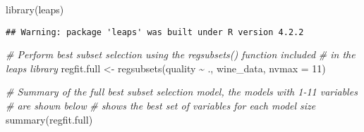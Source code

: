 \documentclass[
]{article}
\newenvironment{Shaded}{\begin{snugshade}}{\end{snugshade}}
\newcommand{\AttributeTok}[1]{\textcolor[rgb]{0.77,0.63,0.00}{#1}}
\newcommand{\CommentTok}[1]{\textcolor[rgb]{0.56,0.35,0.01}{\textit{#1}}}
\newcommand{\DecValTok}[1]{\textcolor[rgb]{0.00,0.00,0.81}{#1}}
\newcommand{\FunctionTok}[1]{\textcolor[rgb]{0.00,0.00,0.00}{#1}}
\newcommand{\NormalTok}[1]{#1}
\newcommand{\OtherTok}[1]{\textcolor[rgb]{0.56,0.35,0.01}{#1}}
\newcommand{\SpecialCharTok}[1]{\textcolor[rgb]{0.00,0.00,0.00}{#1}}
\begin{document}
\begin{Shaded}
\begin{Highlighting}[]
\FunctionTok{library}\NormalTok{(leaps)}
\end{Highlighting}
\end{Shaded}

\begin{verbatim}
## Warning: package 'leaps' was built under R version 4.2.2
\end{verbatim}

\begin{Shaded}
\begin{Highlighting}[]
\CommentTok{\# Perform best subset selection using the regsubsets() function included}
\CommentTok{\# in the leaps library}
\NormalTok{regfit.full }\OtherTok{\textless{}{-}} \FunctionTok{regsubsets}\NormalTok{(quality }\SpecialCharTok{\textasciitilde{}}\NormalTok{ ., wine\_data, }\AttributeTok{nvmax =} \DecValTok{11}\NormalTok{)}

\CommentTok{\# Summary of the full best subset selection model, the models with 1{-}11 variables}
\CommentTok{\# are shown below}
\CommentTok{\# shows the best set of variables for each model size}
\FunctionTok{summary}\NormalTok{(regfit.full)}
\end{Highlighting}
\end{Shaded}
\end{document}
